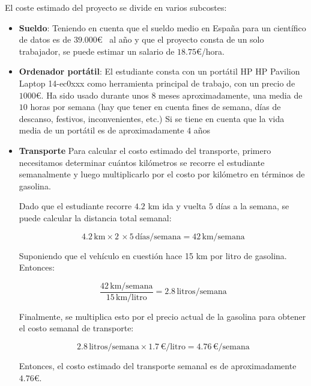 El coste estimado del proyecto se divide en varios subcostes:
\begin{itemize}
      \item \textbf{Sueldo}: Teniendo en cuenta que el sueldo medio en España para un científico de datos es de $39.000$€~\cite{payscale_barcelona} al año y que el proyecto consta de un solo trabajador, se puede estimar un salario de $18.75$€/hora. 
      \item \textbf{Ordenador portátil}: El estudiante consta con un portátil HP HP Pavilion Laptop 14-ec0xxx como herramienta principal de trabajo, con un precio de $1000$€. Ha sido usado durante unos $8$ meses aproximadamente, una media de $10$ horas por semana (hay que tener en cuenta fines de semana, días de descanso, festivos, inconvenientes, etc.) Si se tiene en cuenta que la vida media de un portátil es de aproximadamente $4$ años~\cite{woidasky_use_2021}
      \item \textbf{Transporte} Para calcular el costo estimado del transporte, primero necesitamos determinar cuántos kilómetros se recorre el estudiante semanalmente y luego multiplicarlo por el costo por kilómetro en términos de gasolina.

      Dado que el estudiante recorre $4.2$ km ida y vuelta $5$ días a la semana, se puede calcular la distancia total semanal:
      
      \[ 4.2 \, \text{km} \times 2 \, \times 5 \, \text{días/semana} = 42 \, \text{km/semana} \]
      
      Suponiendo que el vehículo en cuestión hace 15 km por litro de gasolina. Entonces:
      
      \[ \frac{42 \, \text{km/semana}}{15 \, \text{km/litro}} = 2.8 \, \text{litros/semana} \]
      
      Finalmente, se multiplica esto por el precio actual de la gasolina para obtener el costo semanal de transporte:
      
      \[ 2.8 \, \text{litros/semana} \times 1.7 \, \text{€/litro} = 4.76 \, \text{€/semana} \]
      
      Entonces, el costo estimado del transporte semanal es de aproximadamente $4.76$€.
\end{itemize}
